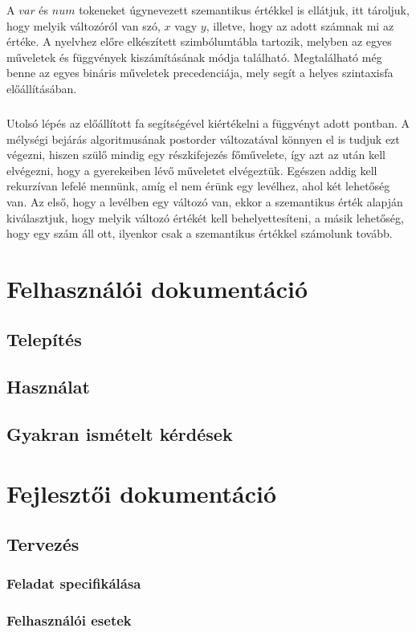 \documentclass{elteikthesis}
\begin{document}
A $var$ és $num$ tokeneket úgynevezett szemantikus értékkel is ellátjuk, itt tároljuk, hogy melyik változóról van szó, $x$ vagy $y$, illetve, hogy az adott számnak mi az értéke. A nyelvhez előre elkészített szimbólumtábla tartozik, melyben az egyes műveletek és függvények kiszámításának módja található. Megtalálható még benne az egyes bináris műveletek precedenciája, mely segít a helyes szintaxisfa előállításában.
\paragraph{}
Utolsó lépés az előállított fa segítségével kiértékelni a függvényt adott pontban. A mélységi bejárás algoritmusának postorder változatával könnyen el is tudjuk ezt végezni, hiszen szülő mindig egy részkifejezés főművelete, így azt az után kell elvégezni, hogy a gyerekeiben lévő műveletet elvégeztük. Egészen addig kell rekurzívan lefelé mennünk, amíg el nem érünk egy levélhez, ahol két lehetőség van. Az első, hogy a levélben egy változó van, ekkor a szemantikus érték alapján kiválasztjuk, hogy melyik változó értékét kell behelyettesíteni, a másik lehetőség, hogy egy szám áll ott, ilyenkor csak a szemantikus értékkel számolunk tovább.
\chapter{Felhasználói dokumentáció}
\section{Telepítés}
\section{Használat}
\section{Gyakran ismételt kérdések}

\chapter{Fejlesztői dokumentáció}
\section{Tervezés}
\subsection{Feladat specifikálása}
\subsection{Felhasználói esetek}
\end{document}
